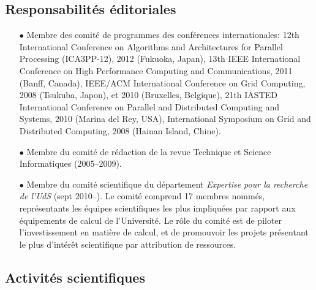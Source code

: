 \subsection{Responsabilités éditoriales}
\begin{itemize}
\item[$\bullet$] 
Membre des comité de programmes des conférences internationales:
12th International Conference on Algorithms and Architectures for Parallel Processing (ICA3PP-12), 2012 (Fukuoka, Japan),
13th IEEE International Conference on High Performance Computing and Communications, 2011 (Banff, Canada),
IEEE/ACM International Conference on Grid Computing, 2008 (Tsukuba, Japon), et 2010 (Bruxelles, Belgique),
21th IASTED International Conference on Parallel and Distributed Computing and Systems, 2010 (Marina del Rey, USA),
International Symposium on Grid and Distributed Computing, 2008 (Hainan Island, Chine). 
\item [$\bullet$]
Membre du comité de rédaction de la revue Technique et Science Informatiques (2005--2009).
\item [$\bullet$]
Membre du comité scientifique du département \emph{Expertise pour la recherche de l'UdS} (sept 2010--).
Le comité comprend 17 membres nommés, représentants les équipes scientifiques les plus impliquées 
par rapport aux équipements de calcul de l'Université. Le rôle du comité est de piloter
l'investissement en matière de calcul, et de promouvoir les projets présentant le plus 
d'intérêt scientifique par attribution de ressources.
\end{itemize}


\subsection{Activités scientifiques}

